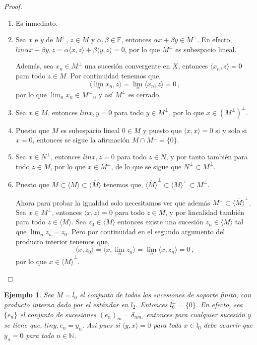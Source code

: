 \documentclass[12pt]{book}
\newtheorem{ejemplo}{\bf Ejemplo}[chapter]
\def\NN{\mathbb{N}}
\def\FF{\mathbb{F}}
\newcommand{\lin}[1]{\langle #1 \rangle}
\newcommand{\Lin}[1]{\langle #1 \rangle}
\begin{document}
\begin{proof}
\begin{enumerate}
\item Es inmediato.
\item  Sea $x$ e $y$ de $M^\perp$, $z\in M$ y $\alpha,\beta\in\FF$, entonces $\alpha x+\beta y\in M^\perp$. En efecto, $lin{\alpha x + \beta y, z}=\alpha \lin{x,z}+\beta\lin{y,z}=0$, por lo que $M^\perp$ es subespacio lineal.

Además, sea $x_n\in M^\perp$ una sucesión convergente en $X$, entonces $\lin{x_n, z}=0$ para todo $z\in M$. Por  continuidad tenemos que,
$$\Lin{\lim_n x_n, z}=\lim_n\lin{x_n,z}=0\,,$$
por lo que $\lim_n x_n\in M^\perp$,,  y así $M^\perp$ es cerrado.
\item Sea $x\in M$, entonces $lin{x,y}=0$ para todo $y\in M^\perp$, por lo que $x\in  (M^\perp)^\perp$.
\item Puesto que $M$ es subespacio lineal $0\in M$  y puesto que $\lin{x,x}=0$ si y solo si $x=0$, entonces se sigue la afirmación $M\cap M^\perp=\{0\}$.
\item Sea $x\in N^\perp$, entonces $lin{x,z}=0$ para todo $z\in N$, y por tanto también para todo $z\in M$, por lo que $x\in M^\perp$, de lo que se sigue que $N^\perp\subset M^\perp$.
\item Puesto que $M\subset \lin{M} \subset \overline{\lin{M}}$ tenemos que, $\overline{\lin{M}}^\perp\subset \lin{M}^\perp\subset M^\perp$. 

Ahora para probar la igualdad solo necesitamos ver que además $M^\perp\subset \overline{\lin{M}}^\perp$. Sea $x\in M^\perp$, entonces $\lin{x,z}=0$ para todo $z\in M$, y por linealidad también para todo $z\in \lin{M}$. Sea $z_0\in\overline{\lin{M}}$ entonces existe una sucesión $z_n\in \lin{M}$ tal que $\lim_n z_n=z_0$. Pero por continuidad en el segundo argumento del producto interior tenemos que,
$$\lin{x,z_0}=\Lin{x,\lim_n z_n}=\lim_n\lin{x,z_n}=0\,,$$ 
por lo que $x\in \overline{\lin{M}}^\perp$. 

\end{enumerate}
\end{proof}
\begin{ejemplo}
Sea $M=l_0$ el  conjunto de todas las sucesiones de soporte finito,  con producto interno dado por el estándar en $l_2$. Entonces $l_0^\perp=\{0\}$.  En efecto, sea $\{e_n\}$ el conjunto de sucesiones $(e_n)_m=\delta_{nm}$, entonces para cualquier sucesión $y$ se tiene que, $lin{y,e_n}=y_n$. Así pues si $\lin{y,x}=0$ para toda $x\in l_0$ debe ocurrir que $y_n=0$ para todo $n\in\NN$.
\end{ejemplo}
\end{document}
